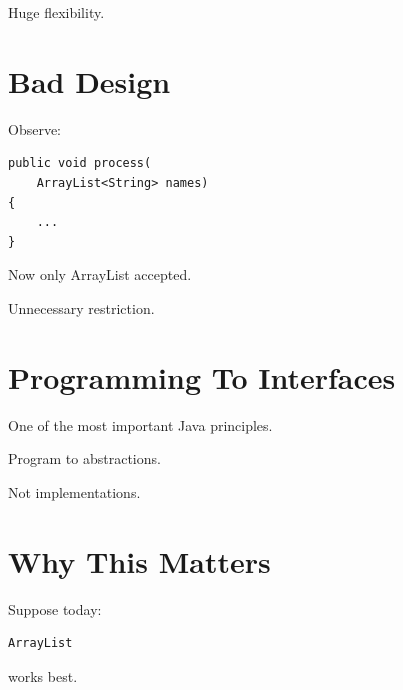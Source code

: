 \documentclass[11pt,a4paper]{book}
\begin{document}
Huge flexibility.


\section{Bad Design}

Observe:

\begin{verbatim} 
public void process(
    ArrayList<String> names)
{
    ...
}
\end{verbatim}


Now only ArrayList accepted.


Unnecessary restriction.


\section{Programming To Interfaces}

One of the most important
Java principles.


\begin{rosettarule}

Program to abstractions.

Not implementations.

\end{rosettarule}


\section{Why This Matters}

Suppose today:

\begin{verbatim} 
ArrayList
\end{verbatim}


works best.

\end{document}
